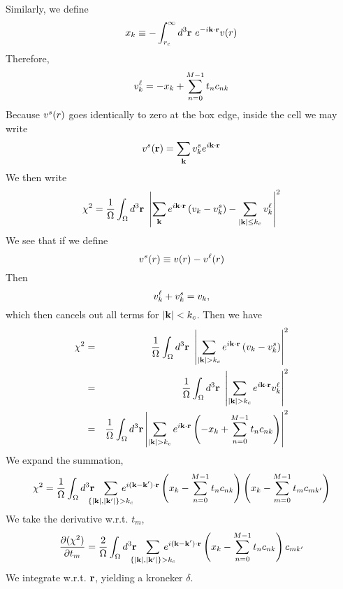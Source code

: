 \documentclass{article}
\begin{document}
Similarly, we define
\begin{equation}
x_k \equiv -\int_{r_c}^\infty d^3\mathbf{r} \ e^{-i\mathbf{k}\cdot\mathbf{r}} v(r)
\end{equation}
Therefore,
\begin{equation}
v^\ell_k = -x_k + \sum_{n=0}^{M-1} t_n c_{nk} 
\end{equation}
Because $v^s(r)$ goes identically to zero at the box edge, inside the
cell we may write
\begin{equation}
v^s(\mathbf{r}) = \sum_{\mathbf{k}} v^s_k e^{i\mathbf{k} \cdot \mathbf{r}}
\end{equation}
We then write
\begin{equation}
\chi^2 = \frac{1}{\Omega} \int_\Omega d^3 \vr \ 
\left| \sum_\vk e^{i\vk \cdot \vr} \left(v_k - \vs_k \right)
-\sum_{|\vk| \le k_c} \vl_k \right|^2
\end{equation}
We see that if we define
\begin{equation}
v^s(r) \equiv v(r) - v^\ell(r)
\end{equation}
Then
\begin{equation}
v^\ell_k + v^s_k = v_k,
\end{equation}
which then cancels out all terms for $|\mathbf{k}| < k_c$.  Then we have
\begin{eqnarray}
\chi^2 & = & \frac{1}{\Omega} \int_\Omega d^3 \vr \ 
\left|\sum_{|\vk|>k_c} e^{i\vk\cdot\vr} 
\left(v_k -\vs_k \right)\right|^2 \\
& = & \frac{1}{\Omega} \int_\Omega d^3 \vr \ 
\left|\sum_{|\vk|>k_c} e^{i\vk\cdot\vr} \vl_k \right|^2 \\ 
& = & 
\frac{1}{\Omega} \int_\Omega d^3 \vr
\left|\sum_{|\vk|>k_c} e^{i\vk\cdot\vr}\left( -x_k + \sum_{n=0}^{M-1} t_n
c_{nk}\right) \right|^2
\end{eqnarray}
We expand the summation,
\newcommand{\ns}{\negthickspace}
\begin{equation}
\chi^2 = \frac{1}{\Omega} \int_\Omega d^3 \vr \ns \ns \ns
\sum_{\{|\vk|,|\vk'|\}>k_c} \ns\ns\ns\ns\ns
 e^{i(\vk-\vk')\cdot \vr}
\left(x_k -\sum_{n=0}^{M-1} t_n c_{nk} \right)
\left(x_k -\sum_{m=0}^{M-1} t_{m} c_{mk'} \right)
\end{equation}
We take the derivative w.r.t. $t_{m}$,
\begin{equation}
\frac{\partial (\chi^2)}{\partial t_{m}} =
\frac{2}{\Omega}\int_\Omega d^3 \vr \ns \ns \ns
\sum_{\{|\vk|,|\vk'|\}>k_c} \ns\ns\ns\ns\ns
 e^{i(\vk-\vk')\cdot \vr}
\left(x_k -\sum_{n=0}^{M-1} t_n c_{nk} \right) c_{mk'}
\end{equation}
We integrate w.r.t. $\mathbf{r}$, yielding a kroneker $\delta$.
\end{document}
